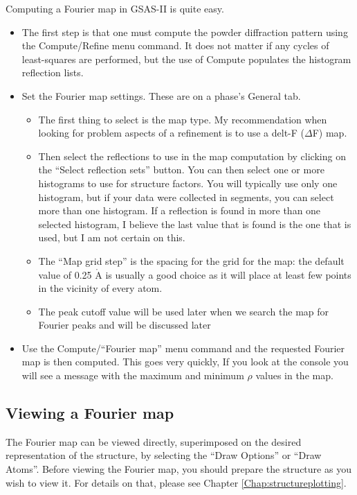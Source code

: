 Computing a Fourier map in GSAS-II is quite easy. 
\begin{itemize}
    \item The first step is that one must compute the powder diffraction pattern using the Compute/Refine menu command. It does not matter if any cycles of least-squares are performed, but the use of Compute populates the histogram reflection lists. 
    \item Set the Fourier map settings. These are on a phase's General tab. 
    \begin{itemize}
        \item The first thing to select is the map type. My recommendation when looking for problem aspects of a refinement is to use a delt-F ($\Delta$F) map. 
        \item Then select the reflections to use in the map computation by clicking on the ``Select reflection sets'' button. You can then select one or more histograms to use for structure factors. You will typically use only one histogram, but if your data were collected in segments, you can select more than one histogram. If a reflection is found in more than one selected histogram, I believe the last value that is found is the one that is used, but I am not certain on this. 
        \item The ``Map grid step'' is the spacing for the grid for the map: the default value of 0.25 $\mathring{\text{A}}$ is usually a good choice as it will place at least few points in the vicinity of every atom. 
        \item The peak cutoff value will be used later when we search the map for Fourier peaks and will be discussed later
    \end{itemize}
    \item     Use the Compute/``Fourier map'' menu command and the requested Fourier map is then computed. This goes very quickly, If you look at the console you will see a message with the maximum and minimum $\rho$ values in the map. 
\end{itemize}

\subsection{Viewing a Fourier map}\label{ref:FourierViewOpts}
The Fourier map can be viewed directly, superimposed on the desired representation of the structure, by selecting the ``Draw Options'' or ``Draw Atoms''. Before viewing the Fourier map, you should prepare the structure as you wish to view it. For details on that, please see  Chapter \ref{Chap:structureplotting}. 

